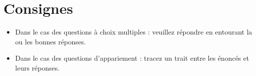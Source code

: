 \documentclass[11pt,a4paper,twoside]{article} %
\begin{document}
\maketitle
\thispagestyle{fancy}
\newpage

\section*{Consignes}
\begin{itemize}
    \item Dans le cas des questions à choix multiples : veuillez répondre en entourant la ou les bonnes réponses. 
    \item Dans le cas des questions d'appariement : tracez un trait entre les énoncés et leurs réponses.
\end{itemize}
\end{document}
